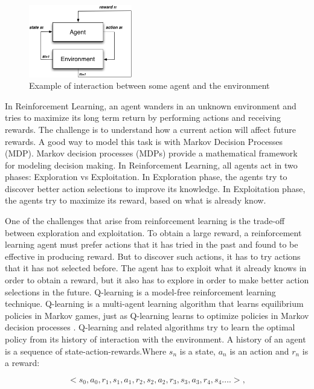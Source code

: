 \documentclass[espaco=umemeio,chapter=TITLE,twoside,openright]{abnt}
\begin{document}
\begin{figure}
\centering
\includegraphics[width=0.4\textwidth]{./images/agentenv.png}
\caption{Example of interaction between some agent and the environment}
\label{fig:agentenv}
\end{figure}

In Reinforcement Learning, an agent wanders in an unknown environment and tries to maximize its long term return by performing actions and receiving rewards. The challenge is to understand how a current action will affect future rewards. A good way to model this task is with Markov Decision Processes (MDP). Markov decision processes (MDPs) provide a mathematical framework for modeling decision making. In Reinforcement Learning, all agents act in two phases: Exploration vs Exploitation. In Exploration phase, the agents try to discover better action selections to improve its knowledge. In Exploitation phase, the agents try to maximize its reward, based on what is already know.

One of the challenges that arise from reinforcement learning is the trade-off between exploration and exploitation. To obtain a large reward, a reinforcement learning
agent must prefer actions that it has tried in the past and found to be effective in producing reward. But to discover such actions, it has to try actions that it has not selected before. The agent has to exploit what it already knows in order to obtain a reward, but it also has to explore in order to make better action selections in the future. Q-learning is a model-free reinforcement learning technique. Q-learning is a multi-agent learning algorithm that learns equilibrium policies in Markov games, just as Q-learning learns to optimize policies in Markov decision processes \cite{Greenwald2003}. Q-learning and related algorithms try to learn the optimal policy from its history of interaction with the environment. A history of an agent is a sequence of state-action-rewards.Where $s_{n}$ is a state, $a_{n}$ is an action and $r_{n}$ is a reward:

\begin{equation}
<s_{0},a_{0},r_{1},s_{1},a_{1},r_{2},s_{2},a_{2},r_{3},s_{3},a_{3},r_{4},s_{4}....>,
\end{equation}
\end{document}

